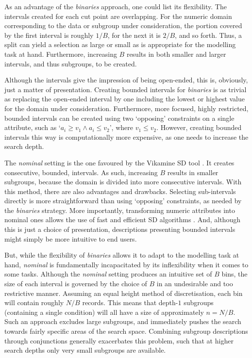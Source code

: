 \documentclass[smallextended]{svjour3}
\newcommand{\subgroup}[1]{\mbox{`$#1$'}}
\newcommand{\parameter}{\emph}
\newcommand{\binaries}{\parameter{binaries}}
\newcommand{\nominal}{\parameter{nominal}}
\newcommand{\sd}{SD}
\begin{document}
As an advantage of the \binaries{} approach, one could list its flexibility.
The intervals created for each cut point are overlapping.
For the numeric domain corresponding to the data or subgroup under consideration, the portion covered by the first interval is roughly $1/B$, for the next it is $2/B$, and so forth.
Thus, a split can yield a selection as large or small as is appropriate for the modelling task at hand.
Furthermore, increasing $B$ results in both smaller and larger intervals, and thus subgroups, to be created.

Although the intervals give the impression of being open-ended, this is, obviously, just a matter of presentation.
Creating bounded intervals for \binaries{} is as trivial as replacing the open-ended interval by one including the lowest or highest value for the domain under consideration.
Furthermore, more focused, highly restricted, bounded intervals can be created using two `opposing' constraints on a single attribute, such as \subgroup{a_i \geq v_1 \wedge a_i \leq v_2}, where $v_1 \leq v_2$.
However, creating bounded intervals this way is computationally more expensive, as one needs to increase the search depth.

The \nominal{} setting is the one favoured by the Vikamine \sd{} tool \cite{atzmueller:2012:vikamine}.
It creates consecutive, bounded, intervals.
As such, increasing $B$ results in smaller subgroups, because the domain is divided into more consecutive intervals.
With this method, there are also advantages and drawbacks.
Selecting sub-intervals directly is more straightforward than using `opposing' constraints, as needed by the \binaries{} strategy.
More importantly, transforming numeric attributes into nominal ones allows the use of fast and efficient \sd{} algorithms \cite{atzmueller:2009:ismis,boley:2017,grosskreutz:2009,lemmerich:2012}.
And, although this is just a choice of presentation, descriptions presenting bounded intervals might simply be more intuitive to end users.

But, while the flexibility of \binaries{} allows it to adapt to the modelling task at hand, \nominal{} is fundamentally incapacitated by its inflexibility when it comes to some tasks.
Although the \nominal{} setting produces an intuitive set of $B$ bins, the size of each interval is governed by the choice of $B$ in an undesirable and too restrictive manner.
Assuming an equal height method of discretisation, each bin will contain roughly $N/B$ records.
This means that depth-$1$ subgroups (containing a single condition) will all have a size of approximately $n=N/B$.
Such an approach excludes large subgroups, and immediately pushes the search towards fairly specific areas of the search space.
Combining subgroup descriptions through conjunctions generally exacerbates this problem, such that at higher search depths only very small subgroups are available.
\end{document}
